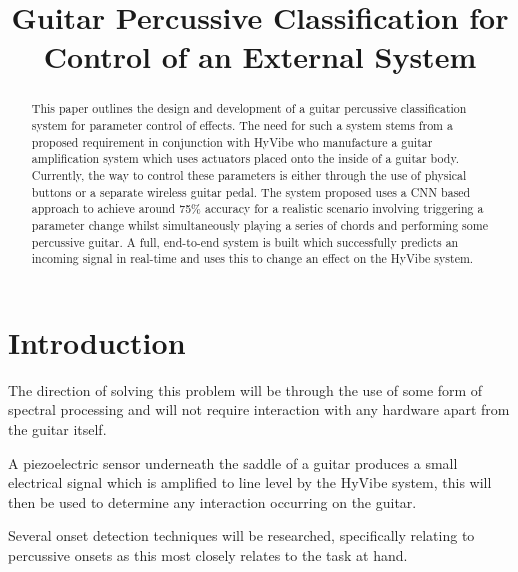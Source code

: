 \documentclass[conference]{IEEEtran}
\begin{document}
\title{Guitar Percussive Classification for Control of an External System\\
}

\author{
}

\maketitle

\begin{abstract}
This paper outlines the design and development of a guitar percussive classification system for parameter control of effects. The need for such a system stems from a proposed
requirement in conjunction with HyVibe who manufacture a guitar amplification system which uses actuators placed onto the inside of a guitar body. Currently, the way to control these parameters is either
through the use of physical buttons or a separate wireless guitar pedal.
The system proposed uses a CNN based approach to achieve around 75\% accuracy for a realistic scenario involving triggering a parameter change whilst simultaneously playing a series of chords and performing some percussive guitar.
A full, end-to-end system is built which successfully predicts an incoming signal in real-time and uses this to change an effect on the HyVibe system.

\end{abstract}
 
\section{Introduction}
The direction of solving this problem will be through the use of some form of spectral processing and will not require interaction with any hardware apart from the guitar itself.

A piezoelectric sensor underneath the saddle of a guitar produces a small electrical signal which is amplified to line level by the HyVibe system, this will then be used to determine
any interaction occurring on the guitar.

Several onset detection techniques will be researched, specifically relating to percussive onsets as this most closely relates to the task at hand.
\end{document}
